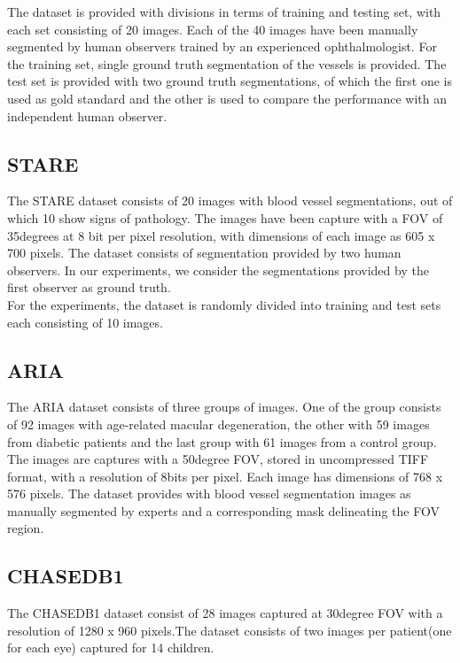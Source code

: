 The dataset is provided with divisions in terms of training and testing set, with each set consisting of 20 images. Each of the 40 images have been manually segmented by human observers trained by an experienced ophthalmologist. For the training set, single ground truth segmentation of the vessels is provided. The test set is provided with two ground truth segmentations, of which the first one is used as gold standard and the other is used to compare the performance with an independent human observer.\\
\clearpage
\subsection{STARE}
The STARE dataset \cite{hoover2000locating,hoover2003locating} consists of 20 images with blood vessel segmentations, out of which 10 show signs of pathology. The images have been capture with a FOV of 35degrees at 8 bit per pixel resolution, with dimensions of each image as 605 x 700 pixels. The dataset consists of segmentation provided by two human observers. In our experiments, we consider the segmentations provided by the first observer as ground truth.\\

For the experiments, the dataset is randomly divided into training and test sets each consisting of 10 images.

\subsection{ARIA}
The ARIA dataset \cite{farnell2008enhancement, zheng2012automated} consists of three groups of images. One of the group consists of 92 images with age-related macular degeneration, the other with 59 images from diabetic patients and the last group with 61 images from a control group.\\

The images are captures with a 50degree FOV, stored in uncompressed TIFF format, with a resolution of 8bits per pixel. Each image has dimensions of 768 x 576 pixels. The dataset provides with blood vessel segmentation images as manually segmented by experts and a corresponding mask delineating the FOV region.
\clearpage
\subsection{CHASEDB1}
The CHASEDB1 dataset \cite{fraz2012ensemble} consist of 28 images captured at 30degree FOV with a resolution of 1280 x 960 pixels.The dataset consists of two images per patient(one for each eye) captured for 14 children. 

